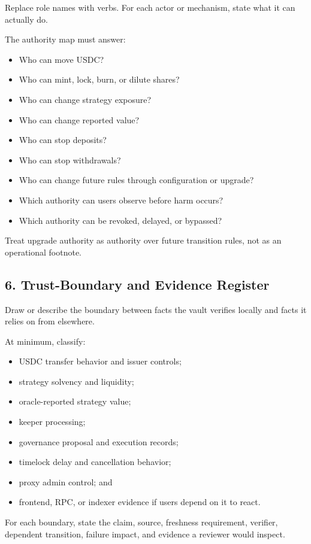 Replace role names with verbs. For each actor or mechanism, state what it can actually do.

The authority map must answer:

\begin{itemize}
\item Who can move USDC?
\item Who can mint, lock, burn, or dilute shares?
\item Who can change strategy exposure?
\item Who can change reported value?
\item Who can stop deposits?
\item Who can stop withdrawals?
\item Who can change future rules through configuration or upgrade?
\item Which authority can users observe before harm occurs?
\item Which authority can be revoked, delayed, or bypassed?
\end{itemize}

Treat upgrade authority as authority over future transition rules, not as an operational footnote.

\subsection*{6. Trust-Boundary and Evidence Register}

Draw or describe the boundary between facts the vault verifies locally and facts it relies on from elsewhere.

At minimum, classify:

\begin{itemize}
\item USDC transfer behavior and issuer controls;
\item strategy solvency and liquidity;
\item oracle-reported strategy value;
\item keeper processing;
\item governance proposal and execution records;
\item timelock delay and cancellation behavior;
\item proxy admin control; and
\item frontend, RPC, or indexer evidence if users depend on it to react.
\end{itemize}

For each boundary, state the claim, source, freshness requirement, verifier, dependent transition, failure impact, and evidence a reviewer would inspect.

